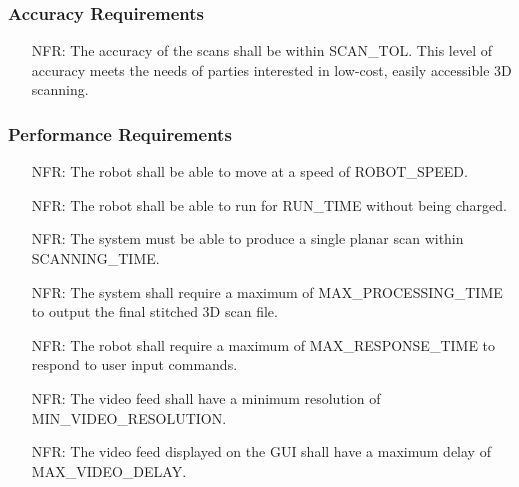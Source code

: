 \documentclass[12pt]{article}
\newcounter{nfrnum} %
\begin{document}
\subsubsection{Accuracy Requirements}
    
\noindent \begin{itemize}
\item[NFR\refstepcounter{nfrnum}\thenfrnum\label{NFR_Accuracy1}:] The accuracy of the scans shall be within SCAN\_TOL. This level of accuracy meets the needs of parties interested in low-cost, easily accessible 3D scanning.
\end{itemize}

\subsubsection{Performance Requirements}

\noindent \begin{itemize}
\item[NFR\refstepcounter{nfrnum}\thenfrnum\label{NFR_Performance1}:] The robot shall be able to move at a speed of ROBOT\_SPEED.
\item[NFR\refstepcounter{nfrnum}\thenfrnum\label{NFR_Performance2}:] The robot shall be able to run for RUN\_TIME without being charged.
\item[NFR\refstepcounter{nfrnum}\thenfrnum\label{NFR_Performance3}:] The system must be able to produce a single planar scan within SCANNING\_TIME.
\item[NFR\refstepcounter{nfrnum}\thenfrnum\label{NFR_Performance4}:] The system shall require a maximum of MAX\_PROCESSING\_TIME to output the final stitched 3D scan file.
\item[NFR\refstepcounter{nfrnum}\thenfrnum\label{NFR_Performance5}:] The robot shall require a maximum of MAX\_RESPONSE\_TIME to respond to user input commands.
\item[NFR\refstepcounter{nfrnum}\thenfrnum\label{NFR_Performance6}:] The video feed shall have a minimum resolution of MIN\_VIDEO\_RESOLUTION.
\item[NFR\refstepcounter{nfrnum}\thenfrnum\label{NFR_Performance7}:] The video feed displayed on the GUI shall have a maximum delay of MAX\_VIDEO\_DELAY.
\end{itemize}
\end{document}
